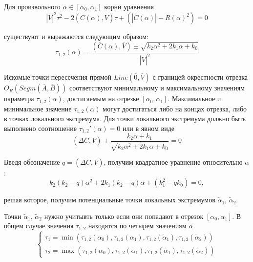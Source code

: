 Для произвольного $\alpha \in [\alpha_0, \alpha_1]$ корни уравнения
\begin{equation}
	|\overline{V}|^2 \tau^2 - 2(\overline{C}(\alpha), \overline{V}) \tau + \left( |\overline{C}(\alpha)| - R(\alpha)^2 \right) = 0
\end{equation}

существуют и выражаются следующим образом:
\begin{equation}
	\tau_{1,2}(\alpha) = \frac{(\overline{C}(\alpha), \overline{V}) \pm \sqrt{k_2 \alpha^2 + 2 k_1 \alpha + k_0}}{|\overline{V}|^2}
\end{equation}

Искомые точки пересечения прямой $Line(\overline{0}, \overline{V})$ с границей окрестности отрезка $O_R(Segm(\overline{A}, \overline{B}))$ соответствуют минимальному и максимальному значениям параметра $\tau_{1,2}(\alpha)$, достигаемым на отрезке $[\alpha_0, \alpha_1]$.
Максимальное и минимальное значение $\tau_{1,2}(\alpha)$ могут достигаться либо на концах отрезка, либо в точках локального экстремума.
Для точки локального экстремума должно быть выполнено соотношение $\tau_{1,2}'(\alpha) = 0$ или в явном виде
\begin{equation}
	(\Delta \overline{C}, \overline{V}) \pm \frac{k_2 \alpha + k_1}{ \sqrt{k_2 \alpha^2 + 2 k_1 \alpha + k_0} } = 0
\end{equation}

Введя обозначение $q = (\Delta \overline{C}, \overline{V})$, получим квадратное уравнение относительно $\alpha$:
\begin{equation}
	k_2 (k_2 - q) \alpha^2 + 2 k_1 (k_2 - q) \alpha + (k_1^2 - q k_0) = 0,
\end{equation}

решая которое, получим потенциальные точки локальных экстремумов $\tilde{\alpha}_1$, $\tilde{\alpha}_2$.

Точки $\tilde{\alpha}_1$, $\tilde{\alpha}_2$ нужно учитывть только если они попадают в отрезок $[\alpha_0, \alpha_1]$.
В общем случае значения $\tau_{1,2}$ находятся по четырем значениям $\alpha$
\begin{equation}
	\left\{
		\begin{aligned}
			\tau_1 = \min(\tau_{1,2}(\alpha_0), \tau_{1,2}(\alpha_1), \tau_{1,2}(\tilde{\alpha}_1), \tau_{1,2}(\tilde{\alpha}_2)) \\
			\tau_2 = \max(\tau_{1,2}(\alpha_0), \tau_{1,2}(\alpha_1), \tau_{1,2}(\tilde{\alpha}_1), \tau_{1,2}(\tilde{\alpha}_2))
		\end{aligned}
	\right.
\end{equation}

